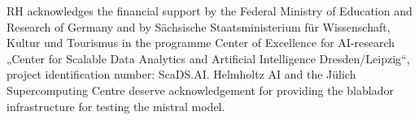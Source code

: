 \documentclass{ecai}
\begin{document}
\begin{ack}
RH acknowledges the financial support by the Federal Ministry of Education and Research of Germany and by Sächsische Staatsministerium für Wissenschaft, Kultur und Tourismus in the programme Center of Excellence for AI-research „Center for Scalable Data Analytics and Artificial Intelligence Dresden/Leipzig“, project identification number: ScaDS.AI.
Helmholtz AI and the Jülich Supercomputing Centre deserve acknowledgement for providing the blablador infrastructure for testing the mistral model.

\end{ack}




\end{document}
